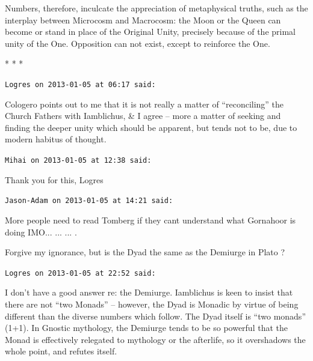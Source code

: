 Numbers, therefore, inculcate the appreciation of metaphysical truths, such as the interplay between Microcosm and Macrocosm: the Moon or the Queen can become or stand in place of the Original Unity, precisely because of the primal unity of the One. Opposition can not exist, except to reinforce the One.



\begin{center}* * *\end{center}

\begin{footnotesize}
\begin{sffamily}
\texttt{Logres on 2013-01-05 at 06:17 said:}

Cologero points out to me that it is not really a matter of ``reconciling'' the Church Fathers with Iamblichus, \& I agree -- more a matter of seeking and finding the deeper unity which should be apparent, but tends not to be, due to modern habitus of thought.

\hfill

\texttt{Mihai on 2013-01-05 at 12:38 said:}

Thank you for this, Logres

\hfill

\texttt{Jason-Adam on 2013-01-05 at 14:21 said:}

More people need to read Tomberg if they cant understand what Gornahoor is doing IMO... ... ... .

Forgive my ignorance, but is the Dyad the same as the Demiurge in Plato ?

\hfill

\texttt{Logres on 2013-01-05 at 22:52 said:}

I don't have a good answer re: the Demiurge. Iamblichus is keen to insist that there are not ``two Monads'' -- however, the Dyad is Monadic by virtue of being different than the diverse numbers which follow. The Dyad itself is ``two monads'' (1+1). In Gnostic mythology, the Demiurge tends to be so powerful that the Monad is effectively relegated to mythology or the afterlife, so it overshadows the whole point, and refutes itself.

\hfill

\end{sffamily}
\end{footnotesize}

